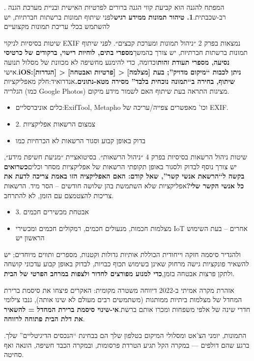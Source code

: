 
. המפתח להגנה הוא קביעת קווי הגנה ברורים לפרטיות האישית ובניית מערכת הגנה רב-שכבתית.\textbf{1. טיהור תמונות ממידע רגיש}לפני שיתוף תמונות ברשתות חברתיות, יש להשתמש בכלי עריכת תמונות מקצועיים


שיטות בסיסיות לניקוי EXIF נמצאות בפרק 2 ״ניהול תמונות ומערכת קבצים״. לפני שיתוף תמונות ברשתות חברתיות, יש צורך בהמשך\textbf{מספרי בתים, לוחיות רישוי, ברקודים של כרטיסי נסיעה, מספרי תעודת זהות}וכדומה, כדי להימנע מחשיפה לא מכוונת של מסלול תנועה אישי.\textbf{iOS:[הגדרות] > [פרטיות ואבטחה] > [מצלמה] ניתן לכבות “מיקום מדויק”; בעת שיתוף, בחירה ב“תמונה נוכחית בלבד” מסירה מטא-נתונים.}אנדרואיד:חלק מאפליקציות הגלריה (כמו Google Photos) מציגות התראה בעת שיתוף האם לשמור מידע מיקום.

\begin{itemize}
  \item כלים אוניברסליים:ExifTool, Metapho וכו' מאפשרים צפייה/עריכה של EXIF.
  \item 2. צמצום הרשאות אפליקציות
  \item בדוק באופן קבוע וסגור הרשאות לא הכרחיות כמו
\end{itemize}


שיטות ניהול הרשאות בסיסיות בפרק 4 ״ניהול הרשאות״. בסיטואציית ״מניעת חשיפת מידע״, יש צורך נוסף לבדוק ולסגור באופן תקופתי הרשאות של אפליקציות מסחר וכלים\textbf{כשרואים בקשה ל“הרשאת אנשי קשר”, שאל קודם: האם האפליקציה הזו באמת צריכה לדעת את כל אנשי הקשר שלי?}אפליקציות שלא השתמשת בהן שלושה חודשים – הסר מיד. הרשאות צריכות להצטמצם עם הזמן, לא להתרחב.

\begin{itemize}
  \item 3. אבטחת מכשירים חכמים
  \item מצלמות חכמות, מנעולים חכמים, רמקולים חכמים ומכשירי IoT אחרים – בעת השימוש הראשון יש
\end{itemize}


ולהגדיר סיסמה חזקה וייחודית הכוללת אותיות גדולות וקטנות, מספרים ותווים מיוחדים; יש להשאיר פונקציות גישה מרחוק שאינן בשימוש תכוף כבויות, לבדוק באופן קבוע עדכוני קושחה ולתקן פרצות אבטחה בזמן,\textbf{כדי למנוע מפורצים לחדור ולצפות במרחב הפרטי של הבית}.

\begin{tcbwarn}{אזהרת מקרה אמיתי}
ב-2022 דיווחה משטרה מקומית: האקרים פיצחו את סיסמת ברירת המחדל של מצלמות ביתיות ממותגות (משתמשים רבים מעולם לא שינו אותה), גנבו צילומי חדרי שינה של אלפי משפחות ומכרו אותם ברשת.\textbf{אי-שינוי סיסמת ברירת המחדל = להשאיר את דלת הבית פתוחה לרווחה}.

\end{tcbwarn}


התמונות, יומני הצ'אט ומסלולי המיקום בטלפון שלך הם בבחינת “הנכסים הדיגיטליים” שלך. ברגע שהם דולפים — במקרה הקל תגיע הטרדת פרסומות, ובמקרה הכבד חשיפה, הונאה ואף סחיטה.
